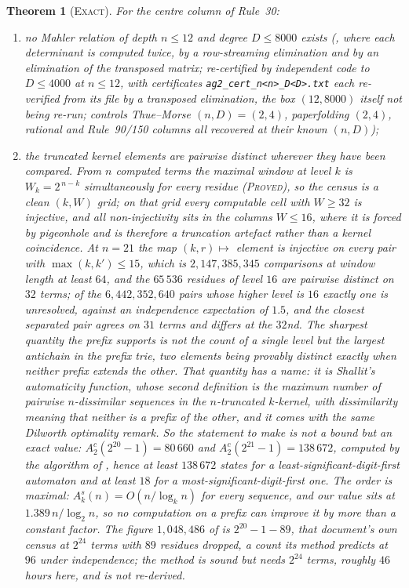 \documentclass[11pt]{article}
\newtheorem{theorem}{Theorem}[section]
\theoremstyle{definition}
\theoremstyle{remark}
\newcommand{\PROVED}{\textsc{Proved}}
\newcommand{\EXACT}{\textsc{Exact}}
\begin{document}
\begin{theorem}[\EXACT]\label{du:certified}
For the centre column of Rule~30:
\begin{enumerate}[nosep]
\item no Mahler relation of depth $n\le12$ and degree $D\le8000$ exists (\cite[Thm.~9]{Auto}, where each determinant is computed twice, by a row-streaming elimination and by an elimination of the transposed matrix; re-certified by independent code to $D\le4000$ at $n\le12$, with certificates \texttt{ag2\_cert\_n<n>\_D<D>.txt} each re-verified from its file by a transposed elimination, the box $(12,8000)$ itself not being re-run; controls Thue--Morse $(n,D)=(2,4)$, paperfolding $(2,4)$, rational and Rule~90/150 columns all recovered at their known $(n,D)$);
\item the truncated kernel elements are pairwise distinct wherever they have been compared. From $n$ computed terms the maximal window at level $k$ is $W_k=2^{\,n-k}$ simultaneously for every residue (\PROVED), so the census is a clean $(k,W)$ grid; on that grid every computable cell with $W\ge32$ is injective, and all non-injectivity sits in the columns $W\le16$, where it is forced by pigeonhole and is therefore a truncation artefact rather than a kernel coincidence. At $n=21$ the map $(k,r)\mapsto$ element is injective on every pair with $\max(k,k')\le15$, which is $2{,}147{,}385{,}345$ comparisons at window length at least $64$, and the $65\,536$ residues of level $16$ are pairwise distinct on $32$ terms; of the $6{,}442{,}352{,}640$ pairs whose higher level is $16$ exactly one is unresolved, against an independence expectation of $1.5$, and the closest separated pair agrees on $31$ terms and differs at the $32$nd. The sharpest quantity the prefix supports is not the count of a single level but the largest antichain in the prefix trie, two elements being provably distinct exactly when neither prefix extends the other. That quantity has a name: it is Shallit's automaticity function, whose second definition \cite[\S1]{Shallit4} is the maximum number of pairwise $n$-dissimilar sequences in the $n$-truncated $k$-kernel, with dissimilarity meaning that neither is a prefix of the other, and it comes with the same Dilworth optimality remark. So the statement to make is not a bound but an exact value: $A^c_2(2^{20}-1)=80\,660$ and $A^c_2(2^{21}-1)=138\,672$, computed by the algorithm of \cite{Shallit4}, hence at least $138\,672$ states for a least-significant-digit-first automaton and at least $18$ for a most-significant-digit-first one. The order is maximal: $A^s_k(n)=O(n/\log_k n)$ for \emph{every} sequence, and our value sits at $1.389\,n/\log_2 n$, so no computation on a prefix can improve it by more than a constant factor. The figure $1{,}048{,}486$ of \cite{Auto} is $2^{20}-1-89$, that document's own census at $2^{24}$ terms with $89$ residues dropped, a count its method predicts at $96$ under independence; the method is sound but needs $2^{24}$ terms, roughly $46$ hours here, and is not re-derived.
\end{enumerate}
\end{theorem}
\end{document}
